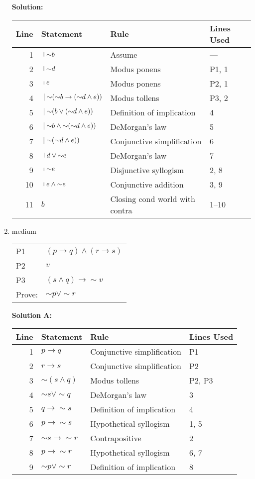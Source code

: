 \documentclass[10pt, letterpaper]{article}
\newcommand{\nott}{{\sim}}
\begin{document}
\begin{enumerate}
\textbf{Solution:}   

\begin{tabular}{|r|l|l|l|} \hline
Line & Statement & Rule & Lines Used \\ \hline
1 & $\ \vline \ \nott b  $& Assume & --- \\ \hline
2 & $\ \vline \ \nott d$ & Modus ponens & P1, 1 \\ \hline
3 & $\ \vline \ e$ & Modus ponens & P2, 1 \\ \hline
4 & $\ \vline \ \nott( \nott b \to (\nott d \land e))$ & Modus tollens & P3, 2 \\ \hline
5 & $\ \vline \ \nott( b \lor (\nott d \land e))$ & Definition of implication & 4 \\ \hline
6 & $\ \vline \ \nott b \land \nott (\nott d \land e))$ & DeMorgan's law & 5 \\ \hline
7 & $\ \vline \ \nott (\nott d \land e))$ & Conjunctive simplification & 6 \\ \hline
8 & $\ \vline \ d \lor \nott e$ & DeMorgan's law & 7 \\ \hline
9 & $\ \vline \ \nott e$ & Disjunctive syllogism & 2, 8 \\ \hline
10& $\ \vline \ e\land \nott e$ & Conjunctive addition & 3, 9 \\ \hline
11& $b$ & Closing cond world with contra & 1--10 \\ \hline
\end{tabular}

\newpage
\item medium

\begin{tabular}[t]{ll}
P1 & $(p \to q) \land (r \to s)$ \\
P2 & $v$ \\
P3 & $(s \land q) \to \nott v$ \\ \hline
Prove: & $\nott p \lor \nott r$
\end{tabular}

\textbf{Solution A:}
                
\begin{tabular}{|r|l|l|l|} \hline
Line & Statement & Rule & Lines Used \\ \hline
1 & $p \to q$ & Conjunctive simplification & P1 \\ \hline
2 & $r \to s$ & Conjunctive simplification & P2 \\ \hline
3 & $\nott (s \land q)$ & Modus tollens & P2, P3 \\ \hline
4 & $\nott s \lor \nott q$ & DeMorgan's law & 3 \\ \hline
5 & $q \to \nott s$ & Definition of implication & 4 \\ \hline
6 & $p \to \nott s$ & Hypothetical syllogism & 1, 5 \\ \hline
7 & $\nott s \to \nott r$ & Contrapositive & 2 \\ \hline
8 & $p \to \nott  r$ & Hypothetical syllogism & 6, 7 \\ \hline
9 & $\nott p \lor \nott  r$ & Definition of implication & 8 \\ \hline
\end{tabular}
                

\end{enumerate}
\end{document}
